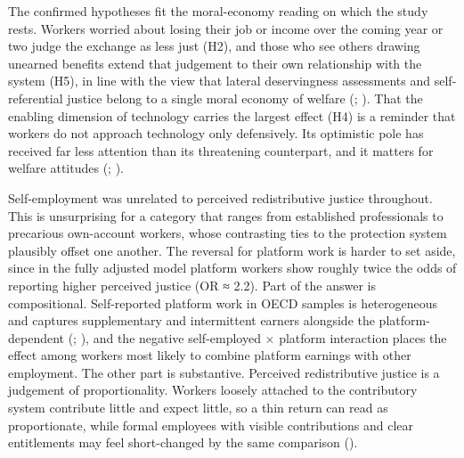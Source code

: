 \documentclass[
  12pt,
]{article}
\begin{document}
The confirmed hypotheses fit the moral-economy reading on which the
study rests. Workers worried about losing their job or income over the
coming year or two judge the exchange as less just (H2), and those who
see others drawing unearned benefits extend that judgement to their own
relationship with the system (H5), in line with the view that lateral
deservingness assessments and self-referential justice belong to a
single moral economy of welfare (; ). That
the enabling dimension of technology carries the largest effect (H4) is
a reminder that workers do not approach technology only defensively. Its
optimistic pole has received far less attention than its threatening
counterpart, and it matters for welfare attitudes
(;
).

Self-employment was unrelated to perceived redistributive justice
throughout. This is unsurprising for a category that ranges from
established professionals to precarious own-account workers, whose
contrasting ties to the protection system plausibly offset one another.
The reversal for platform work is harder to set aside, since in the
fully adjusted model platform workers show roughly twice the odds of
reporting higher perceived justice (OR ≈ 2.2). Part of the answer is
compositional. Self-reported platform work in OECD samples is
heterogeneous and captures supplementary and intermittent earners
alongside the platform-dependent (; ), and the
negative self-employed × platform interaction places the effect among
workers most likely to combine platform earnings with other employment.
The other part is substantive. Perceived redistributive justice is a
judgement of proportionality. Workers loosely attached to the
contributory system contribute little and expect little, so a thin
return can read as proportionate, while formal employees with visible
contributions and clear entitlements may feel short-changed by the same
comparison ().
\end{document}
